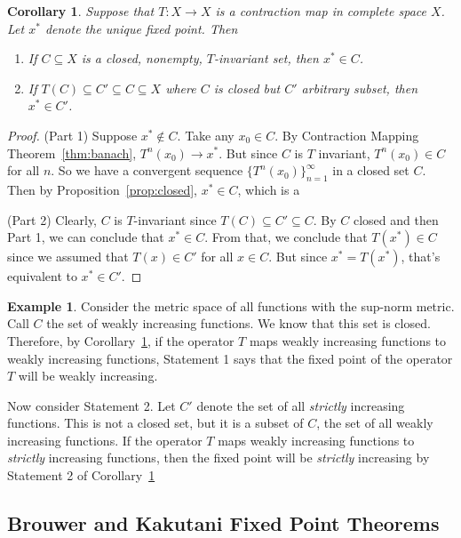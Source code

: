 \documentclass[12pt]{article}
\numberwithin{equation}{section} %
\theoremstyle{plain}
\newtheorem{cor}[thm]{Corollary}
\theoremstyle{definition}
\newtheorem{ex}[thm]{Example}
\theoremstyle{remark}
\newcommand{\ra}{\rightarrow}
\newcommand{\ninf}{_{n=1}^\infty}
\begin{document}
\begin{cor}
\label{cor:cmt}
Suppose that $T: X\rightarrow X$ is a contraction map in complete space
$X$. Let $x^*$ denote the unique fixed point. Then
\begin{enumerate}
  \item If $C\subseteq X$ is a closed, nonempty, $T$-invariant set, then
    $x^* \in C$.
  \item If $T(C)\subseteq C' \subseteq C \subseteq X$ where $C$ is
    closed but $C'$ arbitrary subset, then $x^* \in C'$.
\end{enumerate}
\end{cor}
\begin{proof}
(Part 1)
Suppose $x^*\not\in C$. Take any $x_0\in C$. By Contraction Mapping
Theorem~\ref{thm:banach}, $T^n(x_0)\ra x^*$. But since $C$ is $T$
invariant, $T^n(x_0)\in C$ for all $n$. So we have a convergent
sequence $\{T^n(x_0)\}\ninf$ in a closed set $C$.
Then by Proposition~\ref{prop:closed}, $x^*\in C$, which is a

(Part 2) Clearly, $C$ is $T$-invariant since
$T(C)\subseteq C' \subseteq C$. By $C$ closed and then Part 1, we can
conclude that $x^*\in C$.
From that, we conclude that $T(x^*)\in C$ since we assumed that $T(x)
\in C'$ for all $x \in C$. But since $x^*=T(x^*)$, that's equivalent to
$x^*\in C'$.
\end{proof}

\begin{ex}
Consider the metric space of all functions with the sup-norm metric.
Call $C$ the set of weakly increasing functions. We know that this set
is closed. Therefore, by Corollary~\ref{cor:cmt}, if the operator $T$
maps weakly increasing functions to weakly increasing functions,
Statement 1 says that the fixed point of the operator $T$ will be weakly
increasing.

Now consider Statement 2. Let $C'$ denote the set of all \emph{strictly}
increasing functions. This is not a closed set, but it is a subset of
$C$, the set of all weakly increasing functions. If the operator $T$
maps weakly increasing functions to \emph{strictly} increasing
functions, then the fixed point will be \emph{strictly} increasing by
Statement 2 of Corollary~\ref{cor:cmt}
\end{ex}

\clearpage
\subsection{Brouwer and Kakutani Fixed Point Theorems}
\end{document}
